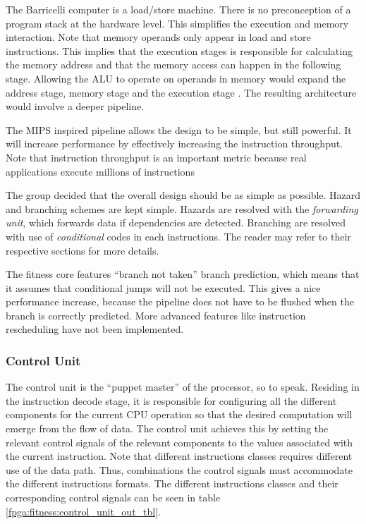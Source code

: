 The Barricelli computer is a load/store machine.
There is no preconception of a program stack at the hardware level.
This simplifies the execution and memory interaction.
Note that memory operands only appear in load and store instructions.
This implies that the execution stages is responsible for calculating the memory address and that the memory access can happen in the following stage.
Allowing the ALU to operate on operands in memory would expand the address stage, memory stage and the execution stage \cite[p.~335]{compOrgDes}.
The resulting architecture would involve a deeper pipeline. 


The MIPS inspired pipeline allows the design to be simple, but still powerful.
It  will increase performance by effectively increasing the instruction throughput.
Note that instruction throughput is an important metric because real applications execute millions of instructions \cite[p.~335]{compOrgDes}


The group decided that the overall design should be as simple as possible.
Hazard and branching schemes are kept simple.
Hazards are resolved with the \emph{forwarding unit}, which forwards data if dependencies are detected.
Branching are resolved with use of \emph{conditional} codes in each instructions.
The reader may refer to their respective sections for more details.

The fitness core features ``branch not taken'' branch prediction, which means that it assumes that conditional jumps will not be executed.
This gives a nice performance increase, because the pipeline does not have to be flushed when the branch is correctly predicted.
More advanced features like instruction rescheduling have not been implemented.

\newpage
\subsubsection{Control Unit} 

The control unit is the ``puppet master'' of the processor, so to speak.
Residing in the instruction decode stage, it is responsible for configuring all the different components for the current CPU operation so that the desired computation will emerge from the flow of data.
The control unit achieves this by setting the relevant control signals of the relevant components to the values associated with the current instruction.
Note that different instructions classes requires different use of the data path.
Thus, combinations the control signals must accommodate the different instructions formats. The different instructions classes and their corresponding control signals can be seen in table \ref{fpga:fitness:control_unit_out_tbl}. 

